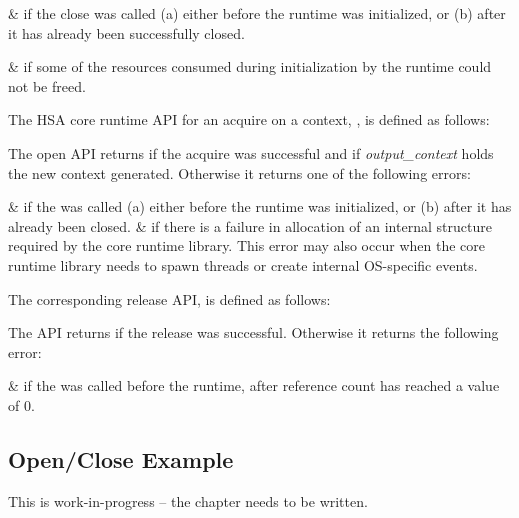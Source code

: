 \begin{easylist}
&  if the close was
called (a) either before the runtime was initialized, or (b)
after it has already been successfully closed.

&  if some of the
resources consumed during initialization by the runtime could not be
freed. 
\end{easylist}

The HSA core runtime API for an acquire on a context,
, is defined as follows:



The open API returns  if the acquire was
successful and if {\itshape output\_context} holds the new context
generated. Otherwise it returns one of the following errors:

\begin{easylist}
&  if the
 was called (a) either before the
runtime was initialized, or (b) after it has already been
closed. 
&  if there is a
failure in allocation of an internal structure required by the core
runtime library. This error may also occur when the core runtime
library needs to spawn threads or create internal OS-specific
events. 
\end{easylist}

The corresponding release API,  is
defined as follows:



The  API returns
 if the release was successful.
Otherwise it returns the following error:

\begin{easylist}
&  if the
 was called before the
runtime, after reference count has reached a value of 0.

\end{easylist}
\subsection{Open/Close Example}
This is {\color{red} work-in-progress} -- the chapter needs to be written.
